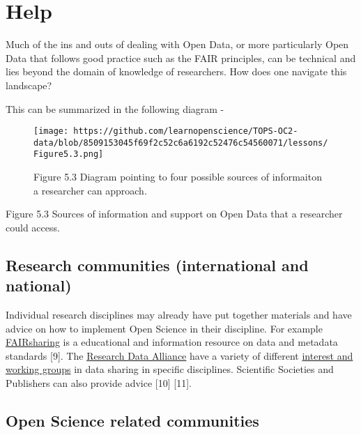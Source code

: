 \documentclass[
  letterpaper,
  DIV=11,
  numbers=noendperiod]{scrreport}
\begin{document}
\hypertarget{help}{%
\section{Help}\label{help}}

Much of the ins and outs of dealing with Open Data, or more particularly
Open Data that follows good practice such as the FAIR principles, can be
technical and lies beyond the domain of knowledge of researchers. How
does one navigate this landscape?

This can be summarized in the following diagram -

\begin{figure}

{\centering \texttt{[image: https://github.com/learnopenscience/TOPS-OC2-data/blob/8509153045f69f2c52c6a6192c52476c54560071/lessons/Figure5.3.png]}

}

\caption{Figure 5.3 Diagram pointing to four possible sources of
informaiton a researcher can approach.}

\end{figure}

Figure 5.3 Sources of information and support on Open Data that a
researcher could access.

\hypertarget{research-communities-international-and-national}{%
\subsection{\texorpdfstring{\textbf{Research communities (international
and
national)}}{Research communities (international and national)}}\label{research-communities-international-and-national}}

Individual research disciplines may already have put together materials
and have advice on how to implement Open Science in their discipline.
For example \href{https://fairsharing.org/}{FAIRsharing} is a
educational and information resource on data and metadata standards
{[}9{]}. The \href{https://rd-alliance.org/}{Research Data Alliance}
have a variety of different
\href{https://www.rd-alliance.org/groups}{interest and working groups}
in data sharing in specific disciplines. Scientific Societies and
Publishers can also provide advice {[}10{]} {[}11{]}.

\hypertarget{open-science-related-communities}{%
\subsection{\texorpdfstring{\textbf{Open Science related
communities}}{Open Science related communities}}\label{open-science-related-communities}}
\end{document}
